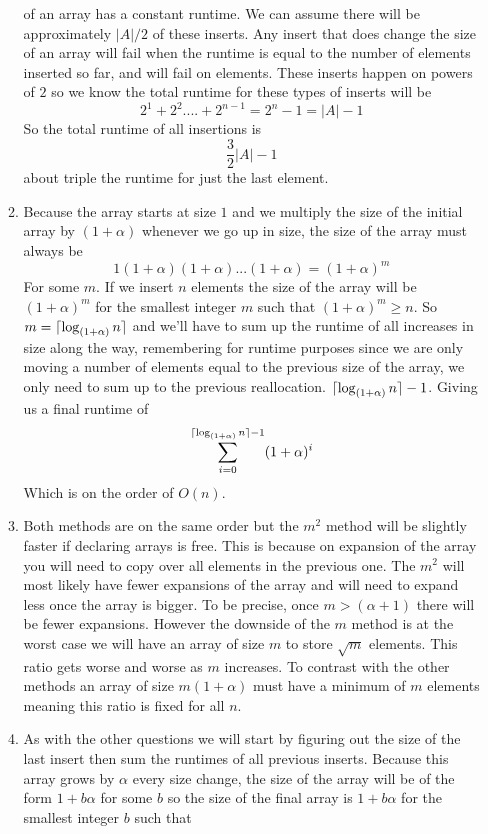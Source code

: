 \documentclass[11pt]{article}
\DeclarePairedDelimiter\ceil{\lceil}{\rceil}
\begin{document}
\begin{enumerate}
\begin{enumerate}
		of an array has a constant runtime. 
		We can assume there
		will be approximately $|A|/2$ of these inserts. Any insert that does change
		the size of an array will fail when the runtime is equal to the
		number of elements inserted so far, and will fail on elements.
		These inserts happen on powers of $2$ so we know the total
		runtime for these types of inserts will be
		$$2^1 + 2^2 .... + 2^{n-1} = 2^n-1 = |A| -1$$
		So the total runtime of all insertions is 
		$$\frac{3}{2}|A| -1$$
		about triple the runtime for just the last element.
	\item Because the array starts at size $1$ and we multiply the size of the initial
		array by $(1+\alpha)$ whenever we go up in size, the size of the
		array must always be
		$$1(1+\alpha)(1+\alpha) ... (1+\alpha) = (1+\alpha)^m$$
		For some $m$. If we insert $n$ elements the size of the array
		will be $(1+\alpha)^m$ for the smallest integer $m$ such that
		$(1+\alpha)^m \geq n$.
		So $m = \ceil{\log_{(1+\alpha)} n}$ and we'll have to
		sum up the runtime of all increases in size along the way, remembering for runtime
		purposes since we are only moving a number of elements equal to
		the previous size of the array, we only need to sum up to the
		previous reallocation.
		$\ceil{\log_{(1+\alpha)}n} -1$. Giving us a final runtime of 
		$$\sum^{\ceil{\log_{(1+\alpha)}n} -1}_{i = 0} (1+\alpha)^i$$
		Which is on the order of $O(n)$.
	\item Both methods are on the same order but the $m^2$ method will be
		slightly faster if declaring arrays is free. This is because on
		expansion of the array you will need to copy over all elements
		in the previous one. The $m^2$ will most likely have fewer
		expansions of the array and will need to expand less 
		once the array is bigger. To be precise, once $m > (\alpha + 1)$
		there will be fewer expansions. However the downside of the $m$
		method is at the worst case we will have an array of size $m$ to
		store $\sqrt m$ elements. This ratio gets worse and worse as $m$
		increases. To contrast with the other methods an array of size
		$m(1 + \alpha)$ must have a minimum of $m$ elements meaning this
		ratio is fixed for all $n$.
	\item As with the other questions we will start by figuring out the size
		of the last insert then sum the runtimes of all previous
		inserts. Because this array grows by $\alpha$ every size change,
		the size of the array will be of the form
		$ 1+b\alpha $ for some $b$ so the size of the final array is
		$ 1+b\alpha $ for the smallest integer $ b $ such that

\end{enumerate}
\end{enumerate}
\end{document}
